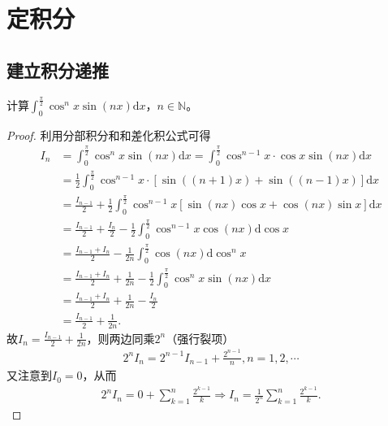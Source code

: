 \documentclass[../../main.tex]{subfiles}%
\begin{document}
\section{定积分}

\subsection{建立积分递推}

\begin{example}
计算\(\int_{0}^{\frac{\pi}{2}} \cos^{n}x\sin(nx)\mathrm{d}x\)，\(n \in \mathbb{N}\)。 
\end{example}
\begin{proof}
利用分部积分和和差化积公式可得
\begin{align*}
I_n&=\int_0^{\frac{\pi}{2}}\cos ^nx\sin(nx) \mathrm{d}x=\int_0^{\frac{\pi}{2}}\cos ^{n - 1}x\cdot\cos x\sin(nx) \mathrm{d}x\\
&=\frac{1}{2}\int_0^{\frac{\pi}{2}}\cos ^{n - 1}x\cdot[\sin((n + 1)x)+\sin((n - 1)x)] \mathrm{d}x\\
&=\frac{I_{n - 1}}{2}+\frac{1}{2}\int_0^{\frac{\pi}{2}}\cos ^{n - 1}x[\sin(nx)\cos x+\cos(nx)\sin x] \mathrm{d}x\\
&=\frac{I_{n - 1}}{2}+\frac{I_n}{2}-\frac{1}{2}\int_0^{\frac{\pi}{2}}\cos ^{n - 1}x\cos(nx) \mathrm{d}\cos x\\
&=\frac{I_{n - 1}+I_n}{2}-\frac{1}{2n}\int_0^{\frac{\pi}{2}}\cos(nx) \mathrm{d}\cos ^nx\\
&=\frac{I_{n - 1}+I_n}{2}+\frac{1}{2n}-\frac{1}{2}\int_0^{\frac{\pi}{2}}\cos ^nx\sin(nx) \mathrm{d}x\\
&=\frac{I_{n - 1}+I_n}{2}+\frac{1}{2n}-\frac{I_n}{2}\\
&=\frac{I_{n - 1}}{2}+\frac{1}{2n}.
\end{align*}
故\(I_n=\frac{I_{n - 1}}{2}+\frac{1}{2n}\)，则两边同乘\(2^n\)（强行裂项）
\begin{align*}
2^nI_n = 2^{n - 1}I_{n - 1}+\frac{2^{n - 1}}{n},n = 1,2,\cdots
\end{align*}
又注意到\(I_0 = 0\)，从而
\begin{align*}
2^nI_n = 0+\sum_{k = 1}^n\frac{2^{k - 1}}{k}\Rightarrow I_n=\frac{1}{2^n}\sum_{k = 1}^n\frac{2^{k - 1}}{k}.
\end{align*}
\end{proof}
\end{document}
